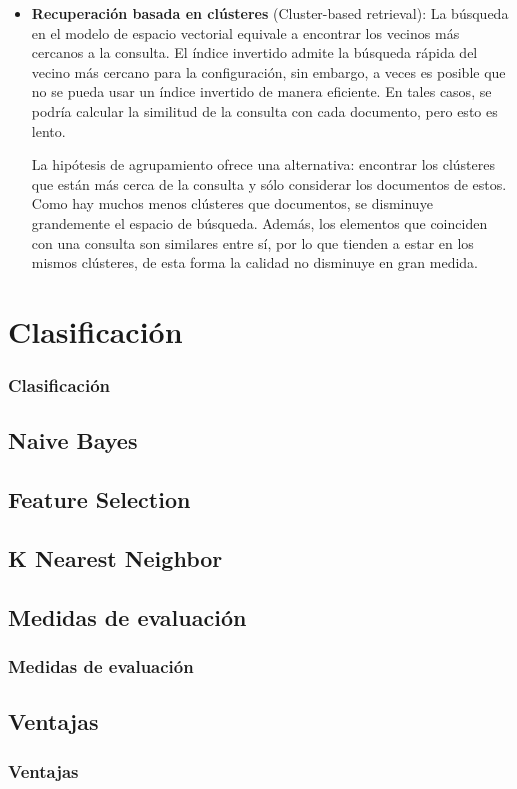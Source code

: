 \documentclass[t,compress,10pt,xcolor=dvipsnames]{beamer}
\begin{document}
{\begin{itemize}
			\framebreak
			\textcolor{white}{.}
			
			\item \textbf{Recuperaci\'on basada en cl\'usteres} (Cluster-based retrieval): La búsqueda en el modelo de espacio vectorial equivale a encontrar los vecinos más cercanos a la consulta. El índice invertido admite la búsqueda rápida del vecino más cercano para la configuración, sin embargo, a veces es posible que no se pueda usar un índice invertido de manera eficiente. En tales casos, se podr\'ia calcular la similitud de la consulta con cada documento, pero esto es lento. 
			
			La hipótesis de agrupamiento ofrece una alternativa: encontrar los cl\'usteres que están más cerca de la consulta y sólo considerar los documentos de estos. Como hay muchos menos clústeres que documentos, se disminuye grandemente el espacio de b\'usqueda. Adem\'as, los elementos que coinciden con una consulta son similares entre sí, por lo que tienden a estar en los mismos cl\'usteres, de esta forma la calidad no disminuye en gran medida.
		\end{itemize}
	}

	\section{Clasificaci\'on}
	\frame
	{
		\frametitle{Clasificaci\'on}
	}
	
	\subsection{Naive Bayes}

	\subsection{Feature Selection}

	\subsection{K Nearest Neighbor}
	
	\subsection{Medidas de evaluaci\'on}
	\frame
	{
		\frametitle{Medidas de evaluaci\'on}	
	}
	
	\subsection{Ventajas}
	\frame
	{
		\frametitle{Ventajas}
	}
	
\end{document}

